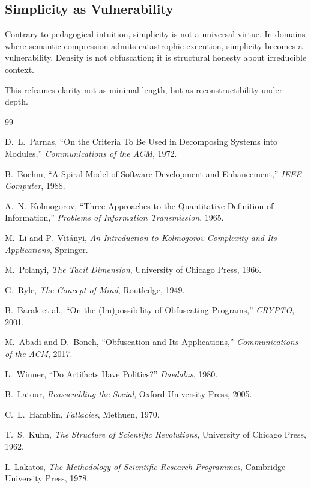 \subsection{Simplicity as Vulnerability}

Contrary to pedagogical intuition, simplicity is not a universal virtue. In domains where semantic compression admits catastrophic execution, simplicity becomes a vulnerability. Density is not obfuscation; it is structural honesty about irreducible context.

This reframes clarity not as minimal length, but as reconstructibility under depth.


\begin{thebibliography}{99}

D.~L.~Parnas, ``On the Criteria To Be Used in Decomposing Systems into Modules,'' \emph{Communications of the ACM}, 1972.

B.~Boehm, ``A Spiral Model of Software Development and Enhancement,'' \emph{IEEE Computer}, 1988.

A.~N.~Kolmogorov, ``Three Approaches to the Quantitative Definition of Information,'' \emph{Problems of Information Transmission}, 1965.

M.~Li and P.~Vitányi, \emph{An Introduction to Kolmogorov Complexity and Its Applications}, Springer.

M.~Polanyi, \emph{The Tacit Dimension}, University of Chicago Press, 1966.

G.~Ryle, \emph{The Concept of Mind}, Routledge, 1949.

B.~Barak et al., ``On the (Im)possibility of Obfuscating Programs,'' \emph{CRYPTO}, 2001.

M.~Abadi and D.~Boneh, ``Obfuscation and Its Applications,'' \emph{Communications of the ACM}, 2017.

L.~Winner, ``Do Artifacts Have Politics?'' \emph{Daedalus}, 1980.

B.~Latour, \emph{Reassembling the Social}, Oxford University Press, 2005.

C.~L.~Hamblin, \emph{Fallacies}, Methuen, 1970.

T.~S.~Kuhn, \emph{The Structure of Scientific Revolutions}, University of Chicago Press, 1962.

I.~Lakatos, \emph{The Methodology of Scientific Research Programmes}, Cambridge University Press, 1978.


\end{thebibliography}
